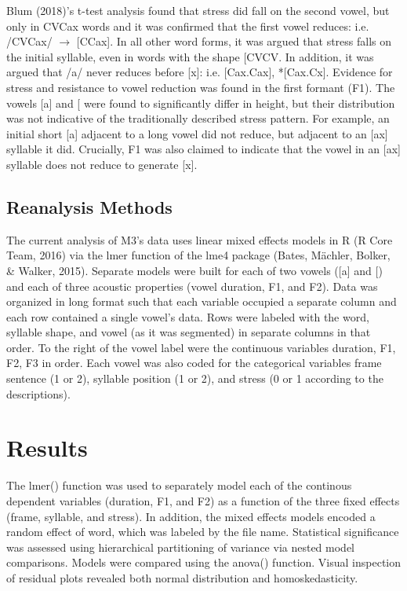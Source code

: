 \documentclass[floatsintext,man]{apa6}
\theoremstyle{definition}
\theoremstyle{definition}
\theoremstyle{definition}
\theoremstyle{remark}
\begin{document}
Blum (2018)'s t-test analysis found that stress did fall on the second
vowel, but only in CVCax words and it was confirmed that the first vowel
reduces: i.e. /CVCax/ \(\rightarrow\) {[}CCax{]}. In all
other word forms, it was argued that stress falls on the initial
syllable, even in words with the shape {[}CVCV\textipa{:}{]}. In
addition, it was argued that /a/ never reduces before {[}x{]}: i.e.
{[}Cax.Cax{]}, *{[}Cax.Cx{]}. Evidence for stress
and resistance to vowel reduction was found in the first formant (F1).
The vowels {[}a{]} and {[}\textipa{@}{]} were found to significantly
differ in height, but their distribution was not indicative of the
traditionally described stress pattern. For example, an initial short
{[}a{]} adjacent to a long vowel did not reduce, but adjacent to an
{[}ax{]} syllable it did. Crucially, F1 was also claimed to indicate
that the vowel in an {[}ax{]} syllable does not reduce to generate
{[}x{]}.

\subsection{Reanalysis Methods}\label{reanalysis-methods}

The current analysis of M3's data uses linear mixed effects models in R
(R Core Team, 2016) via the lmer function of the lme4 package (Bates,
Mächler, Bolker, \& Walker, 2015). Separate models were built for each
of two vowels ({[}a{]} and {[}\textipa{@}{]}) and each of three acoustic
properties (vowel duration, F1, and F2). Data was organized in long
format such that each variable occupied a separate column and each row
contained a single vowel's data. Rows were labeled with the word,
syllable shape, and vowel (as it was segmented) in separate columns in
that order. To the right of the vowel label were the continuous
variables duration, F1, F2, F3 in order. Each vowel was also coded for
the categorical variables frame sentence (1 or 2), syllable position (1
or 2), and stress (0 or 1 according to the descriptions).

\section{Results}\label{results}

The lmer() function was used to separately model each of the continous
dependent variables (duration, F1, and F2) as a function of the three
fixed effects (frame, syllable, and stress). In addition, the mixed
effects models encoded a random effect of word, which was labeled by the
file name. Statistical significance was assessed using hierarchical
partitioning of variance via nested model comparisons. Models were
compared using the anova() function. Visual inspection of residual plots
revealed both normal distribution and homoskedasticity.
\end{document}
